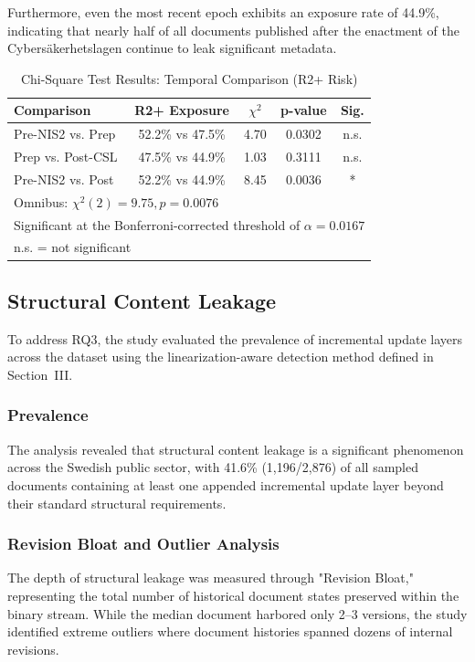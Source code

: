 \documentclass[conference]{IEEEtran}
\begin{document}
Furthermore, even the most recent epoch exhibits an exposure rate of 44.9\%, indicating that nearly half of all documents published after the enactment of the Cybers\"{a}kerhetslagen continue to leak significant metadata.

\begin{table}[htbp]
\centering
\caption{Chi-Square Test Results: Temporal Comparison (R2+ Risk)}
\label{tab:chi_temporal}
\begin{tabular}{|l|c|c|c|c|}
\hline
\textbf{Comparison} & \textbf{R2+ Exposure} & \textbf{$\chi^2$} & \textbf{p-value} & \textbf{Sig.} \\
\hline
Pre-NIS2 vs. Prep & 52.2\% vs 47.5\% & 4.70 & 0.0302 & n.s. \\
Prep vs. Post-CSL & 47.5\% vs 44.9\% & 1.03 & 0.3111 & n.s. \\
Pre-NIS2 vs. Post & 52.2\% vs 44.9\% & 8.45 & 0.0036 & * \\
\hline
\multicolumn{5}{l}{\footnotesize Omnibus: $\chi^2(2) = 9.75, p = 0.0076$} \\
\multicolumn{5}{l}{\footnotesize * Significant at the Bonferroni-corrected threshold of $\alpha = 0.0167$} \\
\multicolumn{5}{l}{\footnotesize n.s. = not significant} \\
\end{tabular}
\end{table}

\subsection{Structural Content Leakage}
To address RQ3, the study evaluated the prevalence of incremental update layers across the dataset using the linearization-aware detection method defined in Section~III.

\subsubsection{Prevalence}
The analysis revealed that structural content leakage is a significant phenomenon across the Swedish public sector, with 41.6\% (1,196/2,876) of all sampled documents containing at least one appended incremental update layer beyond their standard structural requirements.

\subsubsection{Revision Bloat and Outlier Analysis}
The depth of structural leakage was measured through "Revision Bloat," representing the total number of historical document states preserved within the binary stream. While the median document harbored only 2–3 versions, the study identified extreme outliers where document histories spanned dozens of internal revisions.
\end{document}
